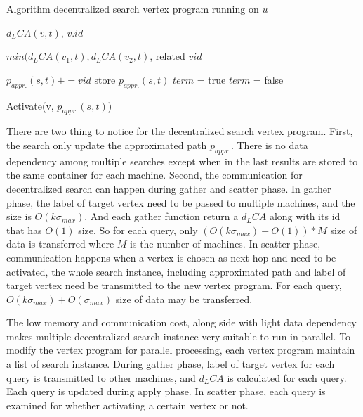 \begin{algorithm}
    \caption{Algorithm decentralized search vertex program running on $u$}
		\label{alg:vc_dec}
    \begin{algorithmic}
        \State \Return $d_LCA(v, t)$, $v.id$
        \EndFunction

        \State \Return $min(d_LCA(v_1,t), d_LCA(v_2,t)$, related $vid$
        \EndFunction

        \State $p_{appr.}(s,t) += vid$
            \State store $p_{appr.}(s,t)$
            \State $term$ = true
        \Else
            \State $term$ = false
        \EndIf
        \EndFunction

            \State Activate(v, $p_{appr.}(s,t)$)
        \EndIf
        \EndFunction
    \end{algorithmic}
\end{algorithm}

There are two thing to notice for the decentralized search vertex program. First, the search only update the approximated path $p_{appr.}$. There is no data dependency among multiple searches except when in the last results are stored to the same container for each machine. Second, the communication for decentralized search can happen during gather and scatter phase. In gather phase, the label of target vertex need to be passed to multiple machines, and the size is $O(k{\sigma}_{max})$. And each gather function return a $d_LCA$ along with its id that has $O(1)$ size. So for each query, only $(O(k{\sigma}_{max}) + O(1)) * M$ size of data is transferred where $M$ is the number of machines. In scatter phase, communication happens when a vertex is chosen as next hop and need to be activated, the whole search instance, including approximated path and label of target vertex need be transmitted to the new vertex program. For each query, $O(k{\sigma}_{max}) + O({\sigma}_{max})$ size of data may be transferred.

The low memory and communication cost, along side with light data dependency makes multiple decentralized search instance very suitable to run in parallel. To modify the vertex program for parallel processing, each vertex program maintain a list of search instance. During gather phase, label of target vertex for each query is transmitted to other machines, and $d_LCA$ is calculated for each query. Each query is updated during apply phase. In scatter phase, each query is examined for whether activating a certain vertex or not.

